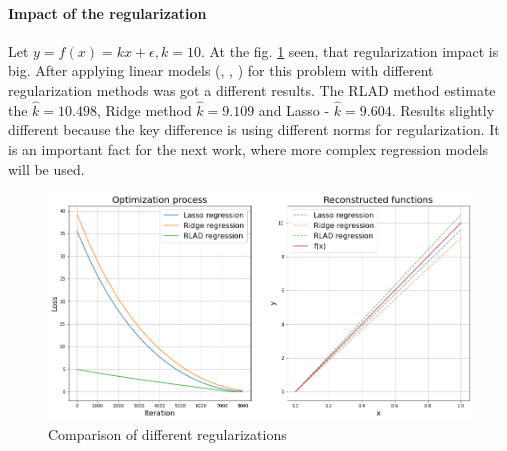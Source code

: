 \paragraph{Impact of the regularization}
Let $y = f(x) = k  x + \epsilon, k = 10$. At the fig. \ref{fig:regularizations} seen, that regularization impact is big. After applying linear models (\cite{ridge}, \cite{lasso}, \cite{rlad}) for this problem with different regularization methods was got a different results. The RLAD method estimate the $\hat{k} = 10.498$, Ridge method $\hat{k} = 9.109$ and Lasso - $\hat{k} = 9.604$. Results slightly different because the key difference is using different norms for regularization. It is an important fact for the next work, where more complex regression models will be used. 

\begin{figure}[h]
	\centering
	\includegraphics[width=0.8 \textwidth]{images/chapter2/reularization_impact.png}
	\caption{Comparison of different regularizations}
	\label{fig:regularizations}
\end{figure}